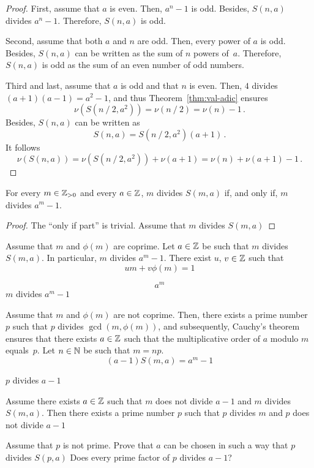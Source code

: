 \begin{proof}
  First, assume that $a$ is even.
  Then, $a^n - 1$ is odd.
  Besides, $S(n, a)$ divides $a^n - 1$.
  Therefore, $S(n, a)$ is odd.

  Second, assume that both $a$ and $n$ are odd.
  Then, every power of $a$ is odd.
  Besides, $S(n, a)$ can be written as the sum of $n$ powers of~$a$.
  Therefore, $S(n, a)$ is odd as the sum of an even number of odd numbers.


  Third and last, assume that $a$ is odd and that $n$ is even.
  Then, $4$ divides $(a + 1)(a - 1) = a^2 - 1$,
  and thus Theorem~\ref{thm:val-adic} ensures
  $$
  \nu(S( n \mathbin{/} 2, a^2)) = \nu ( n  \mathbin{/} 2 ) = \nu(n)  - 1  \, .
  $$
  Besides, $S(n, a)$ can be written as 
  $$
  S(n, a) = S( n  \mathbin{/} 2, a^2) (a + 1) \, . 
  $$
  It follows
  $$
  \nu(S(n, a)) =  \nu(S( n \mathbin{/} 2, a^2)) + \nu(a + 1) =\nu(n) + \nu(a + 1) - 1 \, .
  $$
\end{proof}



\begin{theorem}
  For every $m \in \mathbb{Z}_{> 0}$ and every $a \in \mathbb{Z}$, 
  $m$ divides $S(m, a)$  if, and only if, $m$ divides $a^m - 1$.
\end{theorem}

\begin{proof}
  The ``only if part'' is trivial.
  Assume that  $m$ divides $S(m, a)$
\end{proof}


Assume that  $m$ and $\phi(m)$ are coprime.
Let $a \in \mathbb{Z}$ be such that $m$ divides $S(m, a)$.
In particular, $m$ divides $a^m - 1$.
There exist $u$, $v \in \mathbb{Z}$ such that 
$$
u m + v \phi(m) = 1
$$

$$
a^m 
$$
$m$ divides $a^m - 1$

Assume that $m$ and $\phi(m)$ are not coprime.
Then, there exists a prime number $p$ such that $p$ divides $\gcd(m, \phi(m))$,
and subsequently,
Cauchy's theorem ensures that there exists $a \in \mathbb{Z}$ such that the multiplicative order of $a$ modulo $m$ equals~$p$.
Let $n \in \mathbb{N}$ be such that $m = np$.
$$
(a - 1) S(m, a) = a^m - 1
$$

$p$ divides $a - 1$

Assume there exists $a \in \mathbb{Z}$ such that $m$ does not divide $a - 1$ and $m$ divides $S(m, a)$.
Then there exists a prime number $p$ such that $p$ divides $m$ and $p$ does not divide $a - 1$


\begin{exercise}
   Assume that $p$ is not prime.
    Prove that $a$ can be chosen in such a way that $p$ divides $S(p, a)$
    Does every prime factor of $p$ divides $a - 1$?
\end{exercise} 


